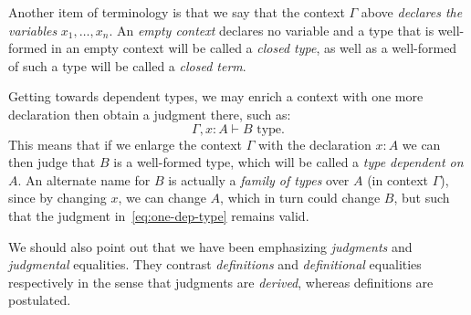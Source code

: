 Another item of terminology is that we say that the context $ \Gamma $
above \emph{declares the variables} $ x_1, \dots, x_n $. An \emph{empty
  context} declares no variable and a type that is well-formed in an
empty context will be called a \emph{closed type}, as well as a well-formed
of such a type will be called a \emph{closed term}.

Getting towards dependent types, we may enrich a context with one more
declaration then obtain a judgment there, such as:
\begin{equation}
  \label{eq:one-dep-type}
  \Gamma, x : A \vdash B \text{ type}.
\end{equation}
This means that if we enlarge the context $ \Gamma $ with the declaration
$ x : A $ we can then judge that $ B $ is a well-formed type, which will
be called a \emph{type dependent on $ A $}. An alternate name for $ B $
is actually a \emph{family of types} over $ A $ (in context $ \Gamma $),
since by changing $ x $, we can change $ A $, which in turn could change $ B $,
but such that the judgment in~\eqref{eq:one-dep-type} remains valid.

We should also point out that we have been emphasizing \emph{judgments}
and \emph{judgmental} equalities. They contrast \emph{definitions}
and \emph{definitional} equalities respectively in the sense that
judgments are \emph{derived}, whereas definitions are postulated.

